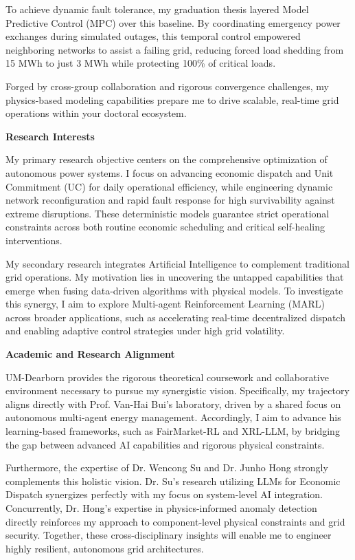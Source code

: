 \documentclass[12pt,letterpaper]{article}
\begin{document}
To achieve dynamic fault tolerance, my graduation thesis layered Model Predictive Control (MPC) over this baseline. By coordinating emergency power exchanges during simulated outages, this temporal control empowered neighboring networks to assist a failing grid, reducing forced load shedding from 15 MWh to just 3 MWh while protecting 100\% of critical loads.

Forged by cross-group collaboration and rigorous convergence challenges, my physics-based modeling capabilities prepare me to drive scalable, real-time grid operations within your doctoral ecosystem.

\vspace{1ex}
\noindent \textbf{Research Interests}

My primary research objective centers on the comprehensive optimization of autonomous power systems. I focus on advancing economic dispatch and Unit Commitment (UC) for daily operational efficiency, while engineering dynamic network reconfiguration and rapid fault response for high survivability against extreme disruptions. These deterministic models guarantee strict operational constraints across both routine economic scheduling and critical self-healing interventions.

My secondary research integrates Artificial Intelligence to complement traditional grid operations. My motivation lies in uncovering the untapped capabilities that emerge when fusing data-driven algorithms with physical models. To investigate this synergy, I aim to explore Multi-agent Reinforcement Learning (MARL) across broader applications, such as accelerating real-time decentralized dispatch and enabling adaptive control strategies under high grid volatility.

\vspace{1ex}
\noindent \textbf{Academic and Research Alignment}

UM-Dearborn provides the rigorous theoretical coursework and collaborative environment necessary to pursue my synergistic vision. Specifically, my trajectory aligns directly with Prof. Van-Hai Bui's laboratory, driven by a shared focus on autonomous multi-agent energy management. Accordingly, I aim to advance his learning-based frameworks, such as FairMarket-RL and XRL-LLM, by bridging the gap between advanced AI capabilities and rigorous physical constraints.

Furthermore, the expertise of Dr. Wencong Su and Dr. Junho Hong strongly complements this holistic vision. Dr. Su's research utilizing LLMs for Economic Dispatch synergizes perfectly with my focus on system-level AI integration. Concurrently, Dr. Hong's expertise in physics-informed anomaly detection directly reinforces my approach to component-level physical constraints and grid security. Together, these cross-disciplinary insights will enable me to engineer highly resilient, autonomous grid architectures.
\end{document}
